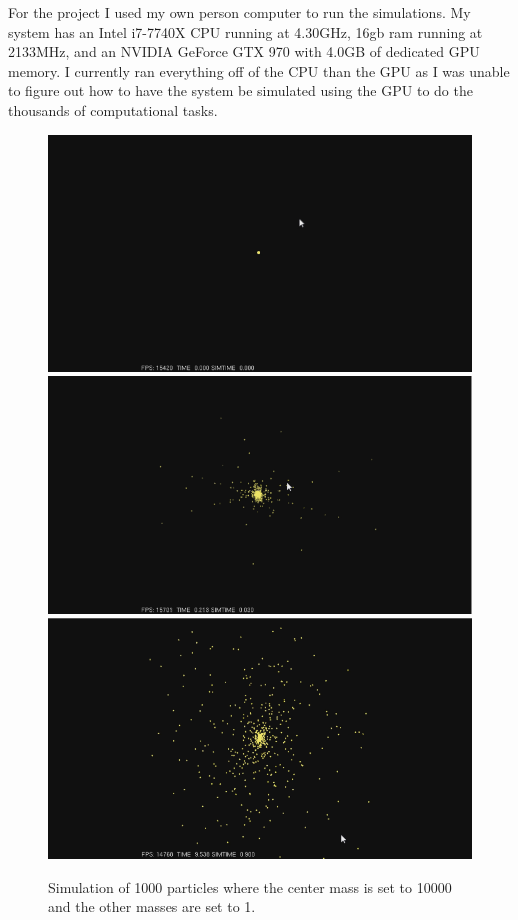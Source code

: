 \documentclass{egpubl}
\begin{document}
    For the project I used my own person computer to run the simulations. My system has an Intel i7-7740X CPU running at 4.30GHz, 16gb ram running at 2133MHz, and an NVIDIA GeForce GTX 970 with 4.0GB of dedicated GPU memory. I currently ran everything off of the CPU than the GPU as I was unable to figure out how to have the system be simulated using the GPU to do the thousands of computational tasks. 

\begin{figure}[H]
  \centering
  \includegraphics[width=.8\linewidth]{Screen_Caps/1000ptk_10000_and_1_1.png}
  \includegraphics[width=.8\linewidth]{Screen_Caps/1000ptk_10000_and_1_2.png}
  \includegraphics[width=.8\linewidth]{Screen_Caps/1000ptk_10000_and_1_3.png}
  \caption{\label{fig:Fig3}
           Simulation of 1000 particles where the center mass is set to 10000 and the other masses are set to 1.}
\end{figure}
\end{document}
